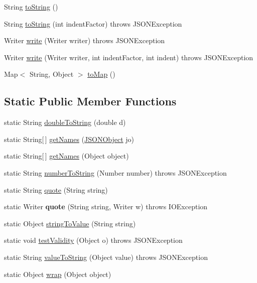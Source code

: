 \begin{DoxyCompactItemize}
\item 
String \hyperlink{classorg_1_1json_1_1JSONObject_a7f8cab6eb354ceb416a421574b4be424}{to\-String} ()
\item 
String \hyperlink{classorg_1_1json_1_1JSONObject_a56087516560b91c8aebbba67efda1a61}{to\-String} (int indent\-Factor)  throws J\-S\-O\-N\-Exception 
\item 
Writer \hyperlink{classorg_1_1json_1_1JSONObject_ac810606f683376f15962ed9b32db9eba}{write} (Writer writer)  throws J\-S\-O\-N\-Exception 
\item 
Writer \hyperlink{classorg_1_1json_1_1JSONObject_afccc699dd9731cbee68c4e3efa8f45c8}{write} (Writer writer, int indent\-Factor, int indent)  throws J\-S\-O\-N\-Exception 
\item 
Map$<$ String, Object $>$ \hyperlink{classorg_1_1json_1_1JSONObject_a681b6f283f7155f4e7f8c6519fea3ae5}{to\-Map} ()
\end{DoxyCompactItemize}
\subsection*{Static Public Member Functions}
\begin{DoxyCompactItemize}
\item 
static String \hyperlink{classorg_1_1json_1_1JSONObject_aad3ea50c3546331486737bcb24e42460}{double\-To\-String} (double d)
\item 
static String\mbox{[}$\,$\mbox{]} \hyperlink{classorg_1_1json_1_1JSONObject_a30d4e44e4c8e03341c346970a00ba283}{get\-Names} (\hyperlink{classorg_1_1json_1_1JSONObject}{J\-S\-O\-N\-Object} jo)
\item 
static String\mbox{[}$\,$\mbox{]} \hyperlink{classorg_1_1json_1_1JSONObject_acf2ec104b4cbbf2947b155d54047efe8}{get\-Names} (Object object)
\item 
static String \hyperlink{classorg_1_1json_1_1JSONObject_a5ea1eb29e2e3bdc7b4fae0579ead8525}{number\-To\-String} (Number number)  throws J\-S\-O\-N\-Exception 
\item 
static String \hyperlink{classorg_1_1json_1_1JSONObject_abe60222a3919d3f88f104486c1ef13fe}{quote} (String string)
\item 
\hypertarget{classorg_1_1json_1_1JSONObject_aac3d22e558d472049d4c8702cdaf676a}{static Writer {\bfseries quote} (String string, Writer w)  throws I\-O\-Exception }\label{classorg_1_1json_1_1JSONObject_aac3d22e558d472049d4c8702cdaf676a}

\item 
static Object \hyperlink{classorg_1_1json_1_1JSONObject_a23f861897abe58eb41c044dd63667319}{string\-To\-Value} (String string)
\item 
static void \hyperlink{classorg_1_1json_1_1JSONObject_a406920be130176bad74d605bae04a6da}{test\-Validity} (Object o)  throws J\-S\-O\-N\-Exception 
\item 
static String \hyperlink{classorg_1_1json_1_1JSONObject_ab386b6f594205eecdbe023ad7cb26105}{value\-To\-String} (Object value)  throws J\-S\-O\-N\-Exception 
\item 
static Object \hyperlink{classorg_1_1json_1_1JSONObject_a5aa793d5ebe4bb6002bd37d84d65742e}{wrap} (Object object)
\end{DoxyCompactItemize}
